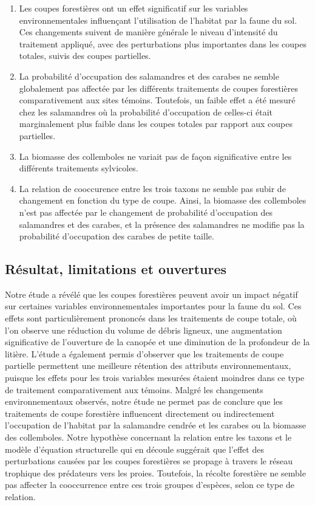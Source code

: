 \begin{enumerate}
  \item Les coupes forestières ont un effet significatif sur les variables environnementales influençant l'utilisation de l'habitat par la faune du sol. Ces changements suivent de manière générale le niveau d'intensité du traitement appliqué, avec des perturbations plus importantes dans les coupes totales, suivis des coupes partielles.
  \item La probabilité d'occupation des salamandres et des carabes ne semble globalement pas affectée par les différents traitements de coupes forestières comparativement aux sites témoins. Toutefois, un faible effet a été mesuré chez les salamandres où la probabilité d'occupation de celles-ci était marginalement plus faible dans les coupes totales par rapport aux coupes partielles.
  \item La biomasse des collemboles ne variait pas de façon significative entre les différents traitements sylvicoles.
  \item La relation de cooccurence entre les trois taxons ne semble pas subir de changement en fonction du type de coupe. Ainsi, la biomasse des collemboles n'est pas affectée par le changement de probabilité d'occupation des salamandres et des carabes, et la présence des salamandres ne modifie pas la probabilité d'occupation des carabes de petite taille.
\end{enumerate}


\subsection{Résultat, limitations et ouvertures}

Notre étude a révélé que les coupes forestières peuvent avoir un impact négatif sur certaines variables environnementales importantes pour la faune du sol. 
Ces effets sont particulièrement prononcés dans les traitements de coupe totale, où l'on observe une réduction du volume de débris ligneux, une augmentation significative de l'ouverture de la canopée et une diminution de la profondeur de la litière. 
L'étude a également permis d'observer que les traitements de coupe partielle permettent une meilleure rétention des attributs environnementaux, puisque les effets pour les trois variables mesurées étaient moindres dans ce type de traitement comparativement aux témoins.
Malgré les changements environnementaux observés, notre étude ne permet pas de conclure que les traitements de coupe forestière influencent directement ou indirectement l'occupation de l'habitat par la salamandre cendrée et les carabes ou la biomasse des collemboles. 
Notre hypothèse concernant la relation entre les taxons et le modèle d'équation structurelle qui en découle suggérait que l'effet des perturbations causées par les coupes forestières se propage à travers le réseau trophique des prédateurs vers les proies. 
Toutefois, la récolte forestière ne semble pas affecter la cooccurrence entre ces trois groupes d'espèces, selon ce type de relation. 

